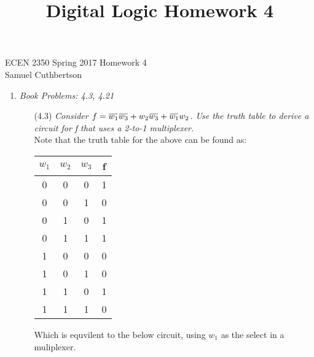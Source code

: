 \documentclass[12pt]{article}
\newcommand{\overbar}[1]{\mkern 1.5mu\overline{\mkern-1.5mu#1\mkern-1.5mu}\mkern 1.5mu}
\begin{document}
\title{Digital Logic Homework 4}

ECEN 2350 Spring 2017 \hfill Homework 4\\
Samuel Cuthbertson

\hrulefill

  \begin{enumerate}
    \vspace{-4mm}
	   \item \textit{Book Problems: 4.3, 4.21}
     \begin{enumerate}
	      \item[(4.3)] \textit{Consider $f = \overbar{w_1}\overbar{w_3} + w_2\overbar{w_3} + \overbar{w_1}w_2$. Use the truth table to derive a circuit for f that uses a 2-to-1 multiplexer.} \\
          Note that the truth table for the above can be found as:
          \begin{center}
            \begin{tabular}{ccc|c}
              $w_1$ & $w_2$ & $w_3$ & f \\
              \hline
              0 & 0 & 0 & 1 \\
              0 & 0 & 1 & 0 \\
              0 & 1 & 0 & 1 \\
              0 & 1 & 1 & 1 \\
              1 & 0 & 0 & 0 \\
              1 & 0 & 1 & 0 \\
              1 & 1 & 0 & 1 \\
              1 & 1 & 1 & 0
            \end{tabular}
          \end{center}
          Which is equvilent to the below circuit, using $w_1$ as the select in a muliplexer.
          \begin{center}
\end{center}
\end{enumerate}
\end{enumerate}
\end{document}
